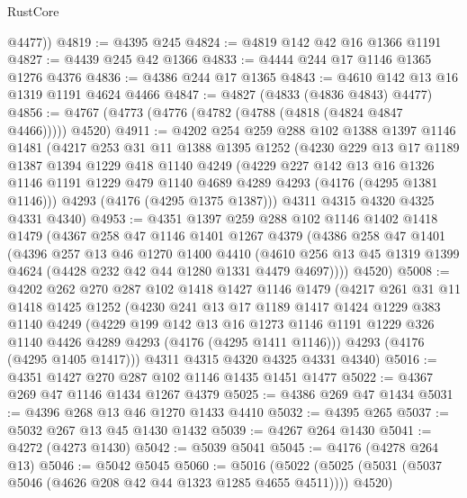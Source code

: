 \begin{lexlean}{RustCore}
\begin{coremodule}
        @4477))
@4819 := @4395 @245
@4824 := @4819 @142 @42 @16 @1366 @1191
@4827 := @4439 @245 @42 @1366
@4833 := @4444 @244 @17 @1146 @1365 @1276 @4376
@4836 := @4386 @244 @17 @1365
@4843 := @4610 @142 @13 @16 @1319 @1191 @4624 @4466
@4847 := @4827 (@4833 (@4836 @4843) @4477)
@4856 := @4767 (@4773 (@4776 (@4782 (@4788 (@4818 (@4824 @4847 @4466))))) @4520)
@4911 := @4202
    @254
    @259
    @288
    @102
    @1388
    @1397
    @1146
    @1481
    (@4217
      @253
      @31
      @11
      @1388
      @1395
      @1252
      (@4230
        @229
        @13
        @17
        @1189
        @1387
        @1394
        @1229
        @418
        @1140
        @4249
        (@4229
          @227
          @142
          @13
          @16
          @1326
          @1146
          @1191
          @1229
          @479
          @1140
          @4689
          @4289
          @4293
          (@4176 (@4295 @1381 @1146)))
        @4293
        (@4176 (@4295 @1375 @1387)))
      @4311
      @4315
      @4320
      @4325
      @4331
      @4340)
@4953 := @4351
    @1397
    @259
    @288
    @102
    @1146
    @1402
    @1418
    @1479
    (@4367
      @258
      @47
      @1146
      @1401
      @1267
      @4379
      (@4386
        @258
        @47
        @1401
        (@4396
          @257
          @13
          @46
          @1270
          @1400
          @4410
          (@4610 @256 @13 @45 @1319 @1399 @4624 (@4428 @232 @42 @44 @1280 @1331 @4479 @4697))))
      @4520)
@5008 := @4202
    @262
    @270
    @287
    @102
    @1418
    @1427
    @1146
    @1479
    (@4217
      @261
      @31
      @11
      @1418
      @1425
      @1252
      (@4230
        @241
        @13
        @17
        @1189
        @1417
        @1424
        @1229
        @383
        @1140
        @4249
        (@4229
          @199
          @142
          @13
          @16
          @1273
          @1146
          @1191
          @1229
          @326
          @1140
          @4426
          @4289
          @4293
          (@4176 (@4295 @1411 @1146)))
        @4293
        (@4176 (@4295 @1405 @1417)))
      @4311
      @4315
      @4320
      @4325
      @4331
      @4340)
@5016 := @4351 @1427 @270 @287 @102 @1146 @1435 @1451 @1477
@5022 := @4367 @269 @47 @1146 @1434 @1267 @4379
@5025 := @4386 @269 @47 @1434
@5031 := @4396 @268 @13 @46 @1270 @1433 @4410
@5032 := @4395 @265
@5037 := @5032 @267 @13 @45 @1430 @1432
@5039 := @4267 @264 @1430
@5041 := @4272 (@4273 @1430)
@5042 := @5039 @5041
@5045 := @4176 (@4278 @264 @13)
@5046 := @5042 @5045
@5060 := @5016
    (@5022 (@5025 (@5031 (@5037 @5046 (@4626 @208 @42 @44 @1323 @1285 @4655 @4511)))) @4520)

\end{coremodule}
\end{lexlean}
